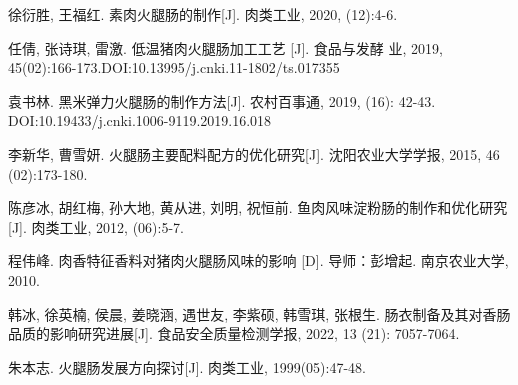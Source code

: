 \documentclass[UTF8]{ctexart}
\begin{document}
	\begin{thebibliography}{99}
		 徐衍胜, 王福红. 素肉火腿肠的制作[J]. 肉类工业, 2020, (12):4-6.

		 任倩, 张诗琪, 雷激. 低温猪肉火腿肠加工工艺 [J]. 食品与发酵
		业, 2019, 45(02):166-173.DOI:10.13995/j.cnki.11-1802/ts.017355  

		 袁书林. 黑米弹力火腿肠的制作方法[J]. 农村百事通, 2019, (16): 42-43. DOI:10.19433/j.cnki.1006-9119.2019.16.018

		 李新华, 曹雪妍. 火腿肠主要配料配方的优化研究[J]. 沈阳农业大学学报, 2015, 46 (02):173-180.  

		 陈彦冰, 胡红梅, 孙大地, 黄从进, 刘明, 祝恒前. 鱼肉风味淀粉肠的制作和优化研究 [J]. 肉类工业, 2012, (06):5-7.   
		
		 程伟峰. 肉香特征香料对猪肉火腿肠风味的影响 [D]. 导师：彭增起. 南京农业大学, 2010. 
 
		 韩冰, 徐英楠, 侯晨, 姜晓涵, 遇世友, 李紫硕, 韩雪琪, 张根生. 肠衣制备及其对香肠品质的影响研究进展[J]. 食品安全质量检测学报, 2022, 13 (21): 7057-7064.

		 朱本志. 火腿肠发展方向探讨[J]. 肉类工业, 1999(05):47-48.
		
	\end{thebibliography}
\end{document}

